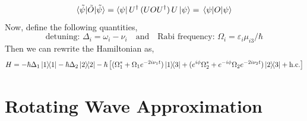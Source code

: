 \documentclass[10pt]{article}
\begin{document}
\begin{equation}
    \langle\Tilde{\psi} | \Tilde{O} | \Tilde{\psi} \rangle = \bra{\psi}U^\dagger \, (UOU^\dagger) \, U\ket{\psi} = \mel{\psi}{O}{\psi}
\end{equation}
Now, define the following quantities,
\begin{equation}
    \text{detuning: }\Delta_i = \omega_i-\nu_i\quad\text{and}\quad\text{Rabi frequency: }\Omega_i=\varepsilon_i\mu_{i3}/\hbar
\end{equation}
Then we can rewrite the Hamiltonian as,
\begin{equation}
    H = -\hbar\Delta_1\ketbra{1}{1} -\hbar\Delta_2\ketbra{2}{2} - \hbar\left[(\Omega_1^* + \Omega_1 e^{-2i\nu_1 t})\ketbra{1}{3} + (e^{i\phi}\Omega_2^* + e^{-i\phi}\Omega_2e^{-2i\nu_2 t}) \ketbra{2}{3} + \text{h.c.} \right]
    \label{eq:H_full}
\end{equation}

\section{Rotating Wave Approximation}
\end{document}

